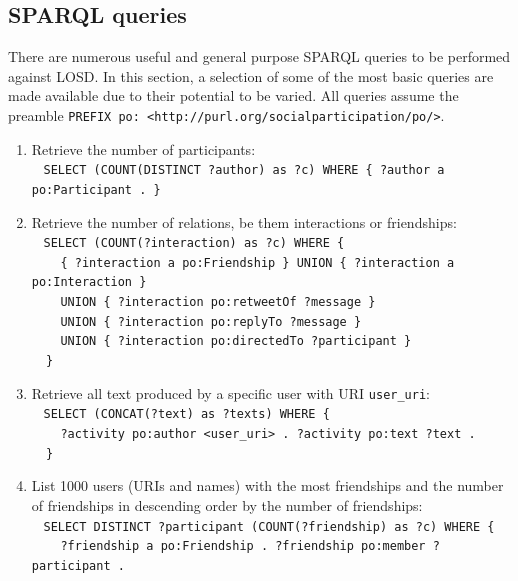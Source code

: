 \documentclass[review]{elsarticle}
\newcommand{\textttt}[1] {\texttt{\footnotesize#1}}
\newcommand{\h} {\hphantom ~ }
\begin{document}
\subsection{SPARQL queries}\label{queries}
There are numerous useful and general purpose SPARQL queries to be performed against LOSD.
In this section, a selection of some of the most basic queries are made available due to their potential to be varied.
All queries assume the preamble \textttt{PREFIX po: <http://purl.org/socialparticipation/po/>}.
\begin{enumerate}[leftmargin=0cm]
	\item Retrieve the number of participants:\\
            \h\textttt{SELECT (COUNT(DISTINCT ?author) as ?c) WHERE \{
            ?author a po:Participant . \} }
	\item Retrieve the number of relations, be them interactions or
            friendships:\\
            \h\textttt{SELECT (COUNT(?interaction) as ?c) WHERE \{\\
            \h        \h \{ ?interaction a po:Friendship \} UNION \{ ?interaction
                    a po:Interaction \}\\
            \h        \h  UNION \{ ?interaction po:retweetOf
                    ?message \} \\
            \h\h  UNION \{ ?interaction po:replyTo ?message \}\\
            \h        \h UNION \{ ?interaction po:directedTo ?participant
                    \}\\
            \h\} }
                  \item Retrieve all text produced by a specific user with URI \textttt{user\_uri}:\\
            \h\textttt{SELECT (CONCAT(?text) as ?texts) WHERE \{\\
            \h        \h ?activity po:author <user\_uri> . ?activity po:text ?text .\\
            \h\}}
        \item List 1000 users (URIs and names) with the most friendships and the number of
            friendships in descending order by the number of friendships:\\
            \h\textttt{SELECT DISTINCT ?participant (COUNT(?friendship) as ?c) WHERE \{\\
            \h    \h ?friendship a po:Friendship . ?friendship po:member ?participant . \\
}
\end{enumerate}
\end{document}
